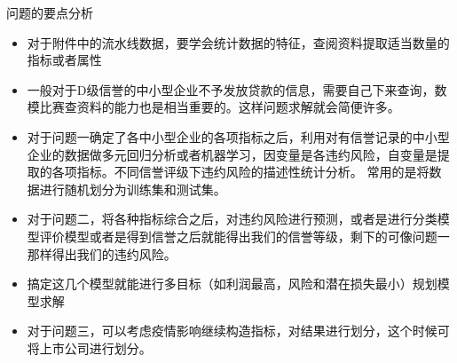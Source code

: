 \documentclass[12pt]{ctexart}
\numberwithin{equation}{section} %
\begin{document}
问题的要点分析
\begin{itemize}
 \item 对于附件中的流水线数据，要学会统计数据的特征，查阅资料提取适当数量的指标或者属性
 \item 一般对于D级信誉的中小型企业不予发放贷款的信息，需要自己下来查询，数模比赛查资料的能力也是相当重要的。这样问题求解就会简便许多。
 \item 对于问题一确定了各中小型企业的各项指标之后，利用对有信誉记录的中小型企业的数据做多元回归分析或者机器学习，因变量是各违约风险，自变量是提取的各项指标。不同信誉评级下违约风险的描述性统计分析。
 常用的是将数据进行随机划分为训练集和测试集。 
 \item 对于问题二，将各种指标综合之后，对违约风险进行预测，或者是进行分类模型评价模型或者是得到信誉之后就能得出我们的信誉等级，剩下的可像问题一那样得出我们的违约风险。
 \item 搞定这几个模型就能进行多目标（如利润最高，风险和潜在损失最小）规划模型求解
 \item 对于问题三，可以考虑疫情影响继续构造指标，对结果进行划分，这个时候可将上市公司进行划分。
\end{itemize}
\end{document}
